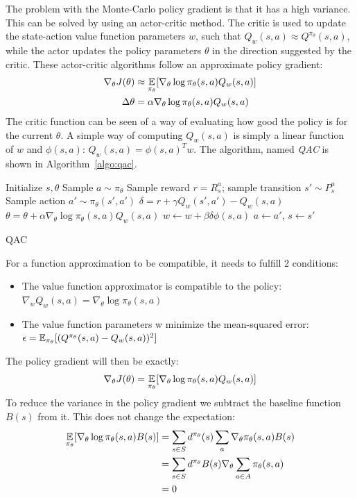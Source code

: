 The problem with the Monte-Carlo policy gradient is that it has a high variance.
This can be solved by using an actor-critic method.
The critic is used to update the state-action value function parameters $w$, such that $Q_w(s,a) \approx Q^{\pi_{\theta}}(s,a)$, while the actor updates the policy parameters $\theta$ in the direction suggested by the critic.
These actor-critic algorithms follow an approximate policy gradient:
\begin{align}
\nabla_{\theta}J(\theta) &\approx \operatorname*{\mathop{{}\mathbb{E}}}_{\pi_{\theta}}[\nabla_{\theta} \log \pi_{\theta}(s,a) Q_w(s,a)]\\
\Delta \theta &= \alpha \nabla_{\theta} \log \pi_{\theta}(s,a) Q_w(s,a)
\end{align}
The critic function can be seen of a way of evaluating how good the policy is for the current $\theta$. A simple way of computing $Q_w(s,a)$ is simply a linear function of $w$ and $\phi(s,a)$: $Q_w(s,a) = \phi(s,a)^T w$. The algorithm, named \textit{QAC} is shown in Algorithm~\ref{algo:qac}.\\
\begin{algorithm}[htb]
\DontPrintSemicolon
Initialize $s,\theta$\;
Sample $a \sim \pi_{\theta}$\;
 {
    Sample reward $r = R_s^a$; sample transition $s' \sim P_s^a$\;
    Sample action $a' \sim \pi_{\theta}(s',a')$\;
    $\delta = r + \gamma Q_w(s',a') - Q_w(s,a)$\;
    $\theta = \theta + \alpha \nabla_{\theta} \log \pi_{\theta}(s,a)Q_w(s,a)$\;
    $w \gets w + \beta \delta \phi (s,a)$\;
    $a \gets a'$, $s \gets s'$\;
    }
\caption{QAC}
\label{algo:qac}
\end{algorithm}
For a function approximation to be compatible, it needs to fulfill 2 conditions:
\begin{itemize}
\item The value function approximator is compatible to the policy: $\nabla_w Q_w(s,a) = \nabla_{\theta} \log \pi_{\theta}(s,a)$
\item The value function parameters w minimize the mean-squared error: $\epsilon = \operatorname*{\mathop{{}\mathbb{E}}}_{\pi_{\theta}} [(Q^{\pi_{\theta}}(s,a) - Q_w(s,a))^2]$
\end{itemize}
The policy gradient will then be exactly:
\begin{equation}
\nabla_{\theta}J(\theta) = \operatorname*{\mathop{{}\mathbb{E}}}_{\pi_{\theta}} [\nabla_{\theta} \log \pi_{\theta}(s,a) Q_w(s,a)]
\end{equation}
To reduce the variance in the policy gradient we subtract the baseline function $B(s)$ from it. This does not change the expectation:
\begin{align}
\begin{split}
\operatorname*{\mathop{{}\mathbb{E}}}_{\pi_{\theta}} [\nabla_{\theta} \log \pi_{\theta}(s,a)B(s)] &= \sum_{s \in S} d^{\pi_{\theta}}(s) \sum_a \nabla_{\theta} \pi_{\theta}(s,a)B(s)\\
&= \sum_{s \in S} d^{\pi_{\theta}}B(s)\nabla_{\theta} \sum_{a \in A} \pi_{\theta} (s,a)\\
&= 0
\end{split}
\end{align}
